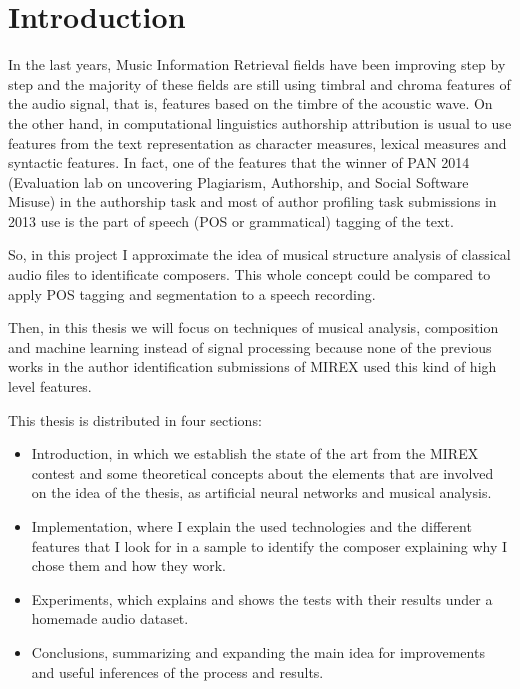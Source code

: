\documentclass[a4paper,openany,oneside,12pt]{book}
\begin{document}
\cleardoublepage
{}
\listoftables


\newpage
\thispagestyle{empty}
\mbox{}
\setlength{\parskip}{\baselineskip}




\chapter{Introduction}
In the last years, Music Information Retrieval fields have been improving step by step and the majority of these fields are still using timbral and chroma features of the audio signal, that is, features based on the timbre of the acoustic wave. On the other hand, in computational linguistics authorship attribution is usual to use features from the text representation as character measures, lexical measures and syntactic features. In fact, one of the features that the winner of PAN 2014 (Evaluation lab on uncovering Plagiarism, Authorship, and Social Software Misuse) in the authorship task\cite{pan14} and most of author profiling task submissions in 2013\cite{pan13} use is the part of speech (POS or grammatical) tagging of the text.

So, in this project I approximate the idea of musical structure analysis of classical audio files to identificate composers. This whole concept could be compared to apply POS tagging and segmentation to a speech recording.

Then, in this thesis we will focus on techniques of musical analysis, composition and machine learning instead of signal processing because none of the previous works in the author identification submissions of MIREX used this kind of high level features.

This thesis is distributed in four sections:
\begin{itemize}
\item Introduction, in which we establish the state of the art from the MIREX contest and some theoretical concepts about the elements that are involved on the idea of the thesis, as artificial neural networks and musical analysis.
\item Implementation, where I explain the used technologies and the different features that I look for in a sample to identify the composer explaining why I chose them and how they work.
\item Experiments, which explains and shows the tests with their results under a homemade audio dataset.
\item Conclusions, summarizing and expanding the main idea for improvements and useful inferences of the process and results.
\end{itemize}
\end{document}
